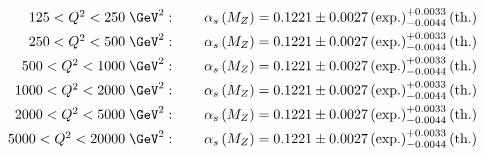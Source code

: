 \begin{align}
	125 < \qsq < 250\;\GeV^2:\qquad \asz &= 0.1221 \pm 0.0027 \left( \text{exp.} \right) ^{+0.0033}_{-0.0044} \left( \text{th.} \right) \notag \\
	250 < \qsq < 500\;\GeV^2:\qquad \asz &= 0.1221 \pm 0.0027 \left( \text{exp.} \right) ^{+0.0033}_{-0.0044} \left( \text{th.} \right) \notag \\
	500 < \qsq < 1000\;\GeV^2:\qquad \asz &= 0.1221 \pm 0.0027 \left( \text{exp.} \right) ^{+0.0033}_{-0.0044} \left( \text{th.} \right) \notag \\
	1000 < \qsq < 2000\;\GeV^2:\qquad \asz &= 0.1221 \pm 0.0027 \left( \text{exp.} \right) ^{+0.0033}_{-0.0044} \left( \text{th.} \right) \notag \\
	2000 < \qsq < 5000\;\GeV^2:\qquad \asz &= 0.1221 \pm 0.0027 \left( \text{exp.} \right) ^{+0.0033}_{-0.0044} \left( \text{th.} \right) \notag \\
	5000 < \qsq < 20000\;\GeV^2:\qquad \asz &= 0.1221 \pm 0.0027 \left( \text{exp.} \right) ^{+0.0033}_{-0.0044} \left( \text{th.} \right) 	
\end{align}
